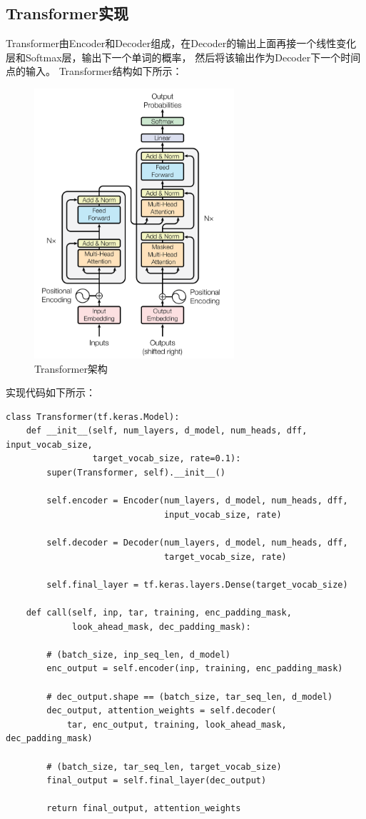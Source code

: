 \documentclass{article}
\begin{document}
\subsection{Transformer实现}
Transformer由Encoder和Decoder组成，在Decoder的输出上面再接一个线性变化层和Softmax层，输出下一个单词的概率，
然后将该输出作为Decoder下一个时间点的输入。\newline
Transformer结构如下所示：
\begin{figure}[H]
    \caption{Transformer架构}
    \label{f000086}
    \centering
    \includegraphics[height=10cm]{images/f000086}
\end{figure}
实现代码如下所示：
\begin{lstlisting}
class Transformer(tf.keras.Model):
    def __init__(self, num_layers, d_model, num_heads, dff, input_vocab_size,
                 target_vocab_size, rate=0.1):
        super(Transformer, self).__init__()

        self.encoder = Encoder(num_layers, d_model, num_heads, dff,
                               input_vocab_size, rate)

        self.decoder = Decoder(num_layers, d_model, num_heads, dff,
                               target_vocab_size, rate)

        self.final_layer = tf.keras.layers.Dense(target_vocab_size)

    def call(self, inp, tar, training, enc_padding_mask,
             look_ahead_mask, dec_padding_mask):

        # (batch_size, inp_seq_len, d_model)
        enc_output = self.encoder(inp, training, enc_padding_mask)

        # dec_output.shape == (batch_size, tar_seq_len, d_model)
        dec_output, attention_weights = self.decoder(
            tar, enc_output, training, look_ahead_mask, dec_padding_mask)

        # (batch_size, tar_seq_len, target_vocab_size)
        final_output = self.final_layer(dec_output)

        return final_output, attention_weights
\end{lstlisting}
\end{document}
